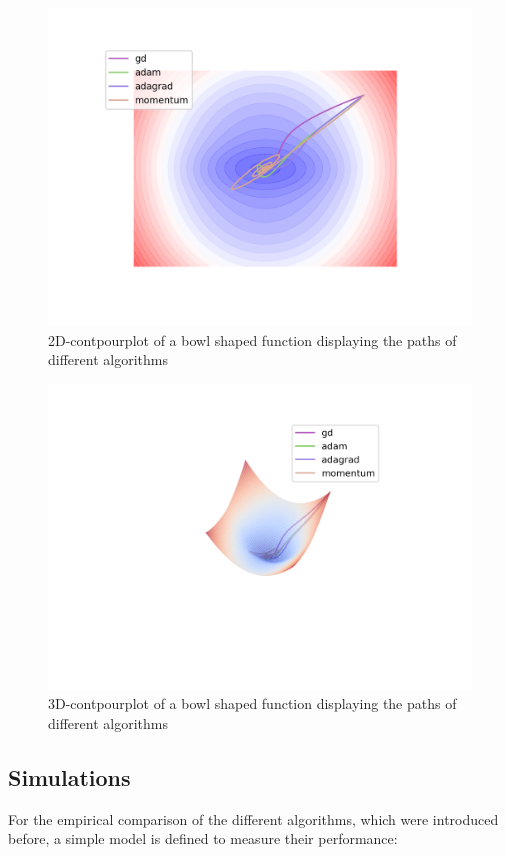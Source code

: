 \documentclass[aodsor,preprint]{imsart}
\numberwithin{equation}{section}
\theoremstyle{plain}
\begin{document}
\begin{figure}[htb]
\centering
\includegraphics[scale=0.7]{images/compare1.png}
\caption{2D-contpourplot of a bowl shaped function displaying the paths of different algorithms}
\label{fig:contour1}
\end{figure}

\begin{figure}[htb]
\centering
\includegraphics[scale=0.7]{images/compare2.png}
\caption{3D-contpourplot of a bowl shaped function displaying the paths of different algorithms}
\label{fig:contour2}
\end{figure}

\subsection{Simulations}
For the empirical comparison of the different algorithms, which were introduced before, a simple model is defined to measure their performance:
\end{document}
